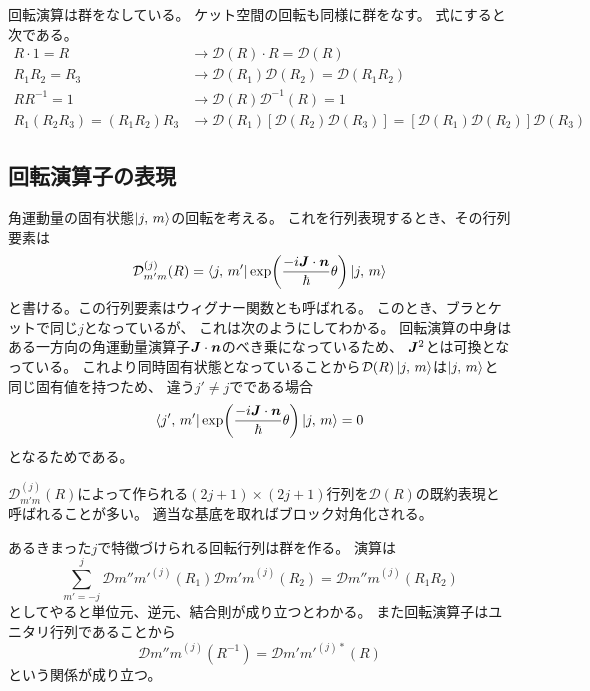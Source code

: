 \documentclass[../master.tex]{subfiles}
\begin{document}
回転演算は群をなしている。
ケット空間の回転も同様に群をなす。
式にすると次である。
\begin{align}
    R\cdot 1 = R &\rightarrow \mathcal{D}(R) \cdot R = \mathcal{D}(R)\\
    R_1 R_2 =R_3 &\rightarrow \mathcal{D}(R_1)\mathcal{D}(R_2) = \mathcal{D}(R_1R_2)\\
    RR^{-1}=1 &\rightarrow \mathcal{D}(R)\mathcal{D}^{-1}(R)=1\\
    R_1(R_2R_3) = (R_1R_2)R_3
        &\rightarrow \mathcal{D}(R_1) [\mathcal{D}(R_2)\mathcal{D}(R_3)] = [\mathcal{D}(R_1) \mathcal{D}(R_2)]\mathcal{D}(R_3)
\end{align}

\subsection{回転演算子の表現}
角運動量の固有状態\(\ket{j,\,m}\)の回転を考える。
これを行列表現するとき、その行列要素は
\begin{equation}
    \mathcal{D}_{m'm}^{(j)}(R) = \bra{j,\,m'} \exp(\frac{-i\vb*{J}\cdot\vb*{n}}{\hbar}\theta)\ket{j,\,m}
\end{equation}
と書ける。この行列要素はウィグナー関数とも呼ばれる。
このとき、ブラとケットで同じ\(j\)となっているが、
これは次のようにしてわかる。
回転演算の中身はある一方向の角運動量演算子\(\vb*{J}\cdot\vb*{n}\)のべき乗になっているため、
\(\vb*{J}^2\)とは可換となっている。
これより同時固有状態となっていることから\(\mathcal{D}(R)\ket{j,\,m}\)は\(\ket{j,\,m}\)と同じ固有値を持つため、
違う\(j'\neq j\)でである場合
\begin{equation}
    \bra{j',\,m'} \exp(\frac{-i\vb*{J}\cdot\vb*{n}}{\hbar}\theta)\ket{j,\,m} = 0
\end{equation}
となるためである。

\(\mathcal{D}_{m'm}^{(j)}(R)\)によって作られる\((2j+1)\times(2j+1)\)行列を\(\mathcal{D}(R)\)の既約表現と呼ばれることが多い。
適当な基底を取ればブロック対角化される。

あるきまった\(j\)で特徴づけられる回転行列は群を作る。
演算は
\begin{equation}
    \sum_{m'=-j}^{j}\mathcal{D}{m''m'}^{(j)}(R_1)\mathcal{D}{m'm}^{(j)}(R_2) = \mathcal{D}{m''m}^{(j)}(R_1R_2)
\end{equation}
としてやると単位元、逆元、結合則が成り立つとわかる。
また回転演算子はユニタリ行列であることから
\begin{equation}
    \mathcal{D}{m''m}^{(j)}(R^{-1})=\mathcal{D}{m'm'}^{(j)*}(R)
\end{equation}
という関係が成り立つ。
\end{document}
